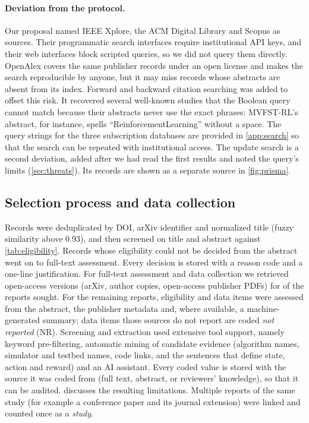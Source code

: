 \paragraph{Deviation from the protocol.} Our proposal named IEEE Xplore, the ACM Digital Library and Scopus as sources. Their programmatic search interfaces require institutional API keys, and their web interfaces block scripted queries, so we did not query them directly. OpenAlex covers the same publisher records under an open license and makes the search reproducible by anyone, but it may miss records whose abstracts are absent from its index. Forward and backward citation searching was added to offset this risk. It recovered several well-known studies that the Boolean query cannot match because their abstracts never use the exact phrases: MVFST-RL's abstract, for instance, spells ``ReinforcementLearning'' without a space. The query strings for the three subscription databases are provided in \cref{app:search} so that the search can be repeated with institutional access. The update search is a second deviation, added after we had read the first results and noted the query's limits (\cref{sec:threats}). Its records are shown as a separate source in \cref{fig:prisma}.

\subsection{Selection process and data collection}
\label{sec:selection}

Records were deduplicated by DOI, arXiv identifier and normalized title (fuzzy similarity above 0.93), and then screened on title and abstract against \cref{tab:eligibility}. Records whose eligibility could not be decided from the abstract went on to full-text assessment. Every decision is stored with a reason code and a one-line justification. For full-text assessment and data collection we retrieved open-access versions (arXiv, author copies, open-access publisher PDFs) for \nFulltext{} of the \nSoughtAll{} reports sought. For the remaining reports, eligibility and data items were assessed from the abstract, the publisher metadata and, where available, a machine-generated summary; data items those sources do not report are coded \emph{not reported} (NR). Screening and extraction used extensive tool support, namely keyword pre-filtering, automatic mining of candidate evidence (algorithm names, simulator and testbed names, code links, and the sentences that define state, action and reward) and an AI assistant. Every coded value is stored with the source it was coded from (full text, abstract, or reviewers' knowledge), so that it can be audited.  discusses the resulting limitations. Multiple reports of the same study (for example a conference paper and its journal extension) were linked and counted once as a \emph{study}.

